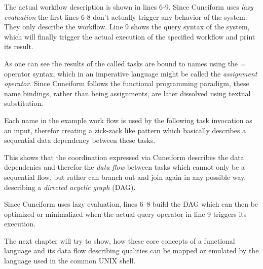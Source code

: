The actual workflow description is shown in lines 6-9. Since
Cuneiform uses \textit{lazy evaluation} the first lines 6-8
don't actually trigger any behavior of the system. They only
describe the workflow. Line 9 shows the query syntax of the
system, which will finally trigger the actual execution of the specified
workflow and print its result.

As one can see the results of the called tasks are bound to names
using the \textit{=} operator syntax, which in an imperative language
might be called the \textit{assignment operator}. Since Cuneiform follows
the functional programming paradigm, these name bindings, rather than
being assignments, are later dissolved using textual substitution.

Each name in the example work flow is used by the following task
invocation as an input, therefor creating a zick-zack like pattern
which basically describes a sequential data dependency between these tasks.

This shows that the coordination expressed via Cuneiform describes the
data dependenies and therefor the \textit{data flow} between tasks which
cannot only be a sequential flow, but rather can branch out and join
again in any possible way, describing a \textit{directed acyclic graph}
(DAG).

Since Cuneiform uses lazy evaluation, lines 6--8 build the DAG which
can then be optimized or minimalized when the actual query operator
in line 9 triggers its execution.
\newline

The next chapter will try to show, how these core concepts of a
functional language and its data flow describing qualities can be
mapped or emulated by the language used in the common UNIX shell.

